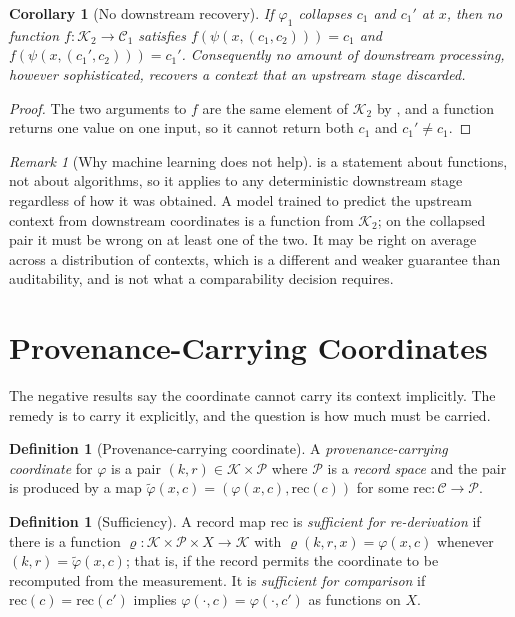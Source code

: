 \documentclass[11pt,a4paper]{article}
\newtheorem{corollary}[theorem]{Corollary}
\theoremstyle{definition}
\newtheorem{definition}[theorem]{Definition}
\theoremstyle{remark}
\newtheorem{remark}[theorem]{Remark}
\newcommand{\Crd}{\mathcal{K}}               %
\newcommand{\Ctx}{\mathcal{C}}               %
\newcommand{\Prv}{\mathcal{P}}               %
\newcommand{\rec}{\mathrm{rec}}
\begin{document}
\begin{corollary}[No downstream recovery]\label{cor:no-recovery}
If $\varphi_1$ collapses $c_1$ and $c_1'$ at $x$, then no function
$f : \Crd_2 \to \Ctx_1$ satisfies
$f(\psi(x,(c_1,c_2))) = c_1$ and $f(\psi(x,(c_1',c_2))) = c_1'$.
Consequently no amount of downstream processing, however sophisticated,
recovers a context that an upstream stage discarded.
\end{corollary}

\begin{proof}
The two arguments to $f$ are the same element of $\Crd_2$ by
, and a function returns one value on one input,
so it cannot return both $c_1$ and $c_1' \neq c_1$.
\end{proof}

\begin{remark}[Why machine learning does not help]\label{rem:ml}
 is a statement about functions, not about
algorithms, so it applies to any deterministic downstream stage
regardless of how it was obtained. A model trained to predict the
upstream context from downstream coordinates is a function from $\Crd_2$;
on the collapsed pair it must be wrong on at least one of the two. It may
be right on average across a distribution of contexts, which is a
different and weaker guarantee than auditability, and is not what a
comparability decision requires.
\end{remark}

\section{Provenance-Carrying Coordinates}
\label{sec:record}

The negative results say the coordinate cannot carry its context
implicitly. The remedy is to carry it explicitly, and the question is how
much must be carried.

\begin{definition}[Provenance-carrying coordinate]\label{def:pcc}
A \emph{provenance-carrying coordinate} for $\varphi$ is a pair
$(k,r) \in \Crd \times \Prv$ where $\Prv$ is a \emph{record space} and
the pair is produced by a map
$\tilde{\varphi}(x,c) = (\varphi(x,c), \rec(c))$
for some $\rec : \Ctx \to \Prv$.
\end{definition}

\begin{definition}[Sufficiency]\label{def:sufficient}
A record map $\rec$ is \emph{sufficient for re-derivation} if there is a
function $\varrho : \Crd \times \Prv \times X \to \Crd$ with
$\varrho(k,r,x) = \varphi(x,c)$ whenever $(k,r) = \tilde{\varphi}(x,c)$;
that is, if the record permits the coordinate to be recomputed from the
measurement. It is \emph{sufficient for comparison} if
$\rec(c) = \rec(c')$ implies $\varphi(\cdot,c) = \varphi(\cdot,c')$ as
functions on $X$.
\end{definition}
\end{document}
